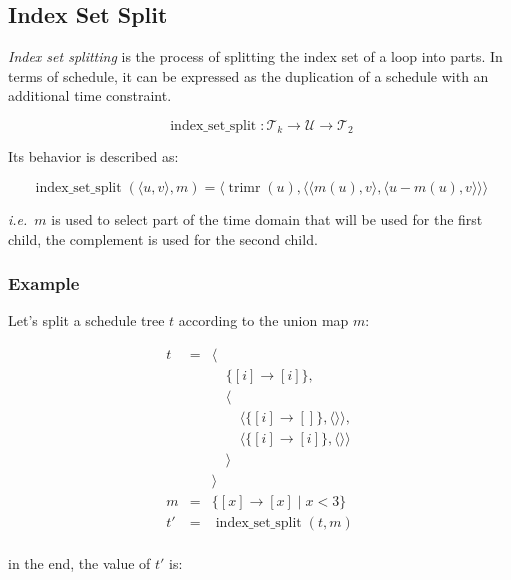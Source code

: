 \documentclass{article}
\DeclareMathOperator\trimr{trimr}
\DeclareMathOperator\indexsetsplit{index\_set\_split}
\begin{document}
\subsection{Index Set Split}

\emph{Index set splitting} is the process of splitting the index set of a loop
into parts. In terms of schedule, it can be expressed as the duplication of a
schedule with an additional time constraint.

\[
    \indexsetsplit: \mathcal{T}_k \rightarrow \mathcal{U} \rightarrow \mathcal{T}_2
\]

Its behavior is described as:

\[
    \indexsetsplit(\langle u, v\rangle, m) = \langle  \trimr(u), \langle  \langle  m(u), v\rangle, \langle  u - m(u), v\rangle \rangle \rangle
\]

\noindent \emph{i.e.}\ $m$ is used to select part of the time domain that will
be used for the first child, the complement is used for the second child.

\subsubsection*{Example}

Let's split a schedule tree $t$ according to the union map $m$:

\[
    \begin{array}{lcl}
        t &=& \langle \\
          & & \quad\{[i] \rightarrow [i] \},\\
          & & \quad\langle \\
          & & \quad\quad \langle\{ [i] \rightarrow [] \}, \langle\rangle\rangle,\\
          & & \quad\quad \langle\{ [i] \rightarrow [i] \}, \langle\rangle\rangle\\
          & & \quad\rangle \\
          & & \rangle \\
        m &=& \{ [x] \rightarrow [x] \mid x < 3 \} \\
        t'&=& \indexsetsplit(t, m) \\
    \end{array}
\]

\noindent in the end, the value of $t'$ is:
\end{document}
